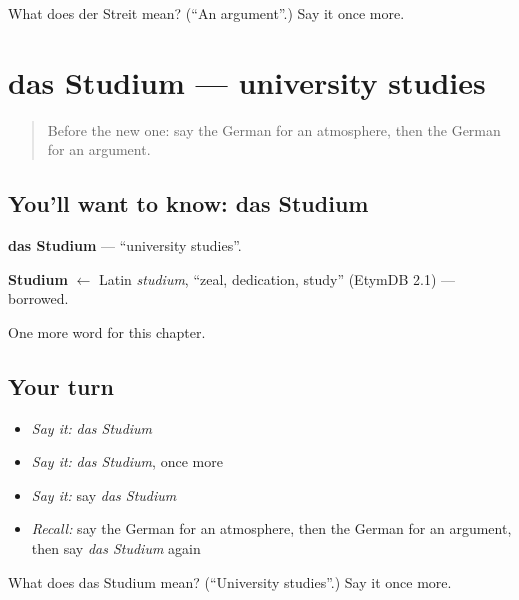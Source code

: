 \begin{tcolorbox}[breakable,colback=teal!4,colframe=teal!35!black,title={Before you move on}]
What does der Streit mean? (\textquotedblleft{}An argument\textquotedblright{}.) Say it once more.
\end{tcolorbox}
\section[das Studium]{das Studium — university studies}

\label{lesson:GE-C239-studium}



\begin{quote}
Before the new one: say the German for an atmosphere, then the German for an argument.
\end{quote}

\subsection*{You'll want to know: das Studium}
\textbf{das Studium} — \textquotedblleft{}university studies\textquotedblright{}.

\begin{cousinweb}
\textbf{Studium} $\leftarrow$ Latin \emph{studium}, \textquotedblleft{}zeal, dedication, study\textquotedblright{} (EtymDB 2.1) — borrowed.
\end{cousinweb}

\begin{grammarlens}[title={What you've built}]
One more word for this chapter.
\end{grammarlens}

\subsection*{Your turn}
\begin{itemize}
\raggedright
  \item \emph{Say it:} \emph{das Studium}
  \item \emph{Say it:} \emph{das Studium}, once more
  \item \emph{Say it:} say \emph{das Studium}
  \item \emph{Recall:} say the German for an atmosphere, then the German for an argument, then say \emph{das Studium} again
\end{itemize}

\begin{tcolorbox}[breakable,colback=teal!4,colframe=teal!35!black,title={Before you move on}]
What does das Studium mean? (\textquotedblleft{}University studies\textquotedblright{}.) Say it once more.
\end{tcolorbox}
